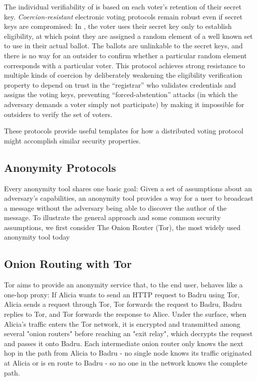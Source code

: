     The individual verifiability of \cite{neff} is based on each
    voter's retention of their secret key. \emph{Coercion-resistant} electronic
    voting protocols remain robust even if secret keys are compromised: In
    \cite{juels_coercion-resistant_2005}, the voter uses their secret key only
    to establish eligibility, at which point they are assigned a random element
    of a well known set to use in their actual ballot. The ballots are
    unlinkable to the secret keys, and there is no way for an outsider to
    confirm whether a particular random element corresponds with a particular
    voter. This protocol achieves strong resistance to multiple kinds of
    coercion by deliberately weakening the eligibility verification property to
    depend on trust in the ``registrar'' who validates credentials and assigns
    the voting keys, preventing ``forced-abstention'' attacks (in which the
    adversary demands a voter simply not participate) by making it impossible
    for outsiders to verify the set of voters.

    These protocols provide useful templates for how a distributed voting
    protocol might accomplish similar security properties.

\subsection{Anonymity Protocols}
\label{subsection:ExistingAnonymity}
  Every anonymity tool shares one basic goal: Given a set of assumptions about
  an adversary's capabilities, an anonymity tool provides a way for a user to
  broadcast a message without the adversary being able to discover the author of
  the message.
  To illustrate the general approach and some common security assumptions, we
  first consider The Onion Router (Tor), the most widely used anonymity tool
  today\cite{ford_hiding_2014}

  \subsection{Onion Routing with Tor}
  \label{Subsubsection:Tor}
    Tor aims to provide an anonymity service that, to the end user, behaves like
    a one-hop proxy: If Alicia wants to send an HTTP request to Badru using Tor,
    Alicia sends a request through Tor, Tor forwards the request to Badru, Badru
    replies to Tor, and Tor forwards the response to Alice. Under the surface,
    when Alicia's traffic enters the Tor network, it is encrypted and
    transmitted among several "onion routers" before reaching an "exit relay",
    which decrypts the request and passes it onto Badru. Each intermediate onion
    router only knows the next hop in the path from Alicia to Badru - no single
    node knows its traffic originated at Alicia or is en route to Badru - so no
    one in the network knows the complete path.

